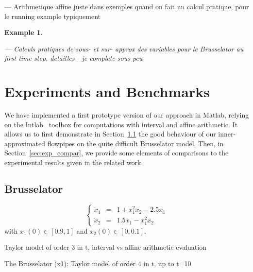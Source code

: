 \documentclass{sig-alternate-05-2015} %
\newcommand\ForAuthors[1]%
 {\par\smallskip                     %
  \begin{center}%
   \fbox%
   {\parbox{0.9\linewidth}%
    {\raggedright\sc--- #1}%
   }%
  \end{center}%
  \par\smallskip                     %
 }
\newtheorem{example}{Example}
\begin{document}
\ForAuthors{Arithmetique affine 
juste dans exemples quand on fait un calcul pratique, pour le running example typiquement}

\begin{example}
\label{running3}
\ForAuthors{Calculs pratiques de sous- et sur- approx des variables pour le Brusselator au first
time step, detailles - je complete sous peu}
\end{example}

\section{Experiments and Benchmarks}
\label{sec:experiments}
We have implemented a first prototype version of our approach in Matlab, relying on the Intlab~\cite{Ru99a} 
toolbox for computations with interval and affine arithmetic.
It allows us to first demonstrate in Section~\ref{sec:exp_bruss} the good behaviour of our inner-approximated flowpipes
 on the quite difficult Brusselator model. %
Then, in Section~\ref{sec:exp_compar}, we provide some elements of comparisons to the experimental results 
given in the related work. 
 
\subsection{Brusselator}
\label{sec:exp_bruss}
$$\left\{\begin{array}{rcl}
\dot{x}_1 & = & 1+x_1^2x_2-2.5x_1 \\
\dot{x}_2 & = & 1.5x_1-x_1^2x_2
\end{array}\right.$$
\noindent with $x_1(0) \in [0.9,1]$ and $x_2(0) \in [0,0.1]$.

Taylor model of order 3 in t, interval vs affine arithmetic evaluation
\begin{center}
\end{center}



The Brusselator (x1): Taylor model of order 4 in t, up to t=10

\begin{center}
\end{center}
\end{document}
